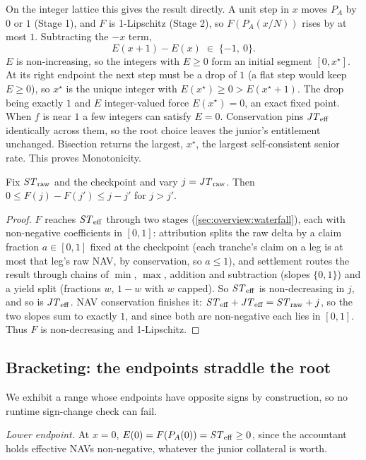 On the integer lattice this gives the result directly. A unit step in
$x$ moves $P_A$ by $0$ or $1$ (Stage 1), and $F$ is 1-Lipschitz (Stage
2), so $F(P_A(x/N))$ rises by at most $1$. Subtracting the $-x$ term,
\[
  E(x{+}1) - E(x) \;\in\; \{-1,\ 0\}.
\]
$E$ is non-increasing, so the integers with $E \geq 0$ form an initial
segment $[0, x^\star]$. At its right endpoint the next step must be a drop of
$1$ (a flat step would keep $E \geq 0$), so $x^\star$ is the unique
integer with $E(x^\star) \geq 0 > E(x^\star{+}1)$. The drop being
exactly $1$ and $E$ integer-valued force $E(x^\star) = 0$, an exact
fixed point. When $f$ is near $1$ a few integers can satisfy $E = 0$.
Conservation pins $\mathit{JT}_{\mathrm{eff}}$ identically across them, so the root choice
leaves the junior's entitlement unchanged. Bisection returns the
largest, $x^\star$, the largest self-consistent senior rate. This proves
Monotonicity.

\begin{lemma}
\label{lem:F}
Fix $\mathit{ST}_{\mathrm{raw}}$ and the checkpoint and vary $j = \mathit{JT}_{\mathrm{raw}}$. Then
$0 \leq F(j) - F(j') \leq j - j'$ for $j > j'$.
\end{lemma}

\begin{proof}
$F$ reaches $\mathit{ST}_{\mathrm{eff}}$ through two stages
(\cref{sec:overview:waterfall}), each with non-negative coefficients in
$[0,1]$: attribution splits the raw delta by a claim fraction
$a \in [0,1]$ fixed at the checkpoint (each tranche's claim on a leg is
at most that leg's raw NAV, by conservation, so $a \leq 1$), and
settlement routes the result
through chains of $\min$, $\max$, addition and subtraction (slopes
$\{0,1\}$) and a yield split (fractions $w$, $1-w$ with $w$ capped).
So $\mathit{ST}_{\mathrm{eff}}$ is non-decreasing in $j$, and so is $\mathit{JT}_{\mathrm{eff}}$. NAV
conservation finishes it: $\mathit{ST}_{\mathrm{eff}} + \mathit{JT}_{\mathrm{eff}} = \mathit{ST}_{\mathrm{raw}} + j$, so the two
slopes sum to exactly $1$, and since both are non-negative each lies in
$[0,1]$. Thus $F$ is non-decreasing and 1-Lipschitz.
\end{proof}

\subsection{Bracketing: the endpoints straddle the root}
\label{sec:existence:sign}

We exhibit a range whose endpoints have opposite signs by construction,
so no runtime sign-change check can fail.

\emph{Lower endpoint.} At $x = 0$, $E(0) = F(P_A(0)) = \mathit{ST}_{\mathrm{eff}} \geq 0$,
since the accountant holds effective NAVs non-negative, whatever the
junior collateral is worth.

